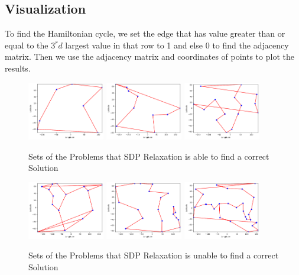 \documentclass{article}
\begin{document}
\subsection{Visualization}
To find the Hamiltonian cycle, we set the edge that has value greater than or equal to the $3^rd$ largest value in that row to 1 and else 0 to find the adjacency matrix. Then we use the adjacency matrix and coordinates of points to plot the results.
\begin{figure}[!ht]
    \centering
    \includegraphics[width=0.3\textwidth]{assets/tsp7.png}
    \includegraphics[width=0.3\textwidth]{assets/tsp-10.png}
    \includegraphics[width=0.3\textwidth]{assets/tsp-15-works.png}
    \caption{Sets of the Problems that SDP Relaxation is able to find a correct Solution}
    \label{fig:my_label}
\end{figure}
\begin{figure}[!ht]
    \centering
    \includegraphics[width=0.3\textwidth]{assets/tsp-15.png}
    \includegraphics[width=0.3\textwidth]{assets/tsp-20.png}
    \includegraphics[width=0.3\textwidth]{assets/tsp-30.png}
    \caption{Sets of the Problems that SDP Relaxation is unable to find a correct Solution}
    \label{fig:my_label}
\end{figure}
\end{document}
